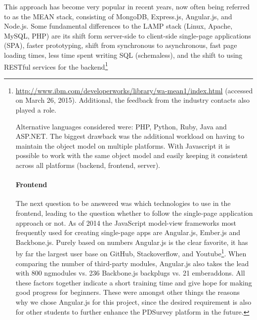 		This approach has become very popular in recent years, now often being referred to as the MEAN stack, consisting of MongoDB, Express.js, Angular.js, and Node.js. Some fundamental differences to the LAMP stack (Linux, Apache, MySQL, PHP) are its shift form server-side to client-side single-page applications (SPA), faster prototyping, shift from synchronous to asynchronous, fast page loading times, less time spent writing SQL (schemaless), and the shift to using RESTful services for the backend\footnote{\url{http://www.ibm.com/developerworks/library/wa-mean1/index.html} (accessed on March 26, 2015). Additional, the feedback from the industry contacts also played a role. 

		Alternative languages considered were: PHP, Python, Ruby, Java and ASP.NET. The biggest drawback was the additional workload on having to maintain the object model on multiple platforms. With Javascript it is possible to work with the same object model and easily keeping it consistent across all platforms (backend, frontend, server).



	\paragraph{Frontend}

		The next question to be answered was which technologies to use in the frontend, leading to the question whether to follow the single-page application approach or not. As of 2014 the JavaScript model-view frameworks most frequently used for creating single-page apps are Angular.js, Ember.js and Backbone.js. Purely based on numbers Angular.js is the clear favorite, it has by far the largest user base on GitHub, Stackoverflow, and Youtube\footnote{\url{https://www.airpair.com/js/javascript-framework-comparison} (accessed on January 11, 2015)}. When comparing the number of third-party modules, Angular.js also takes the lead with 800 ngmodules vs. 236 Backbone.js backplugs vs. 21 emberaddons. All these factors together indicate a short training time and give hope for making good progress for beginners. These were amongst other things the reasons why we chose Angular.js for this project, since the desired requirement is also for other students to further enhance the PDSurvey platform in the future.

}
